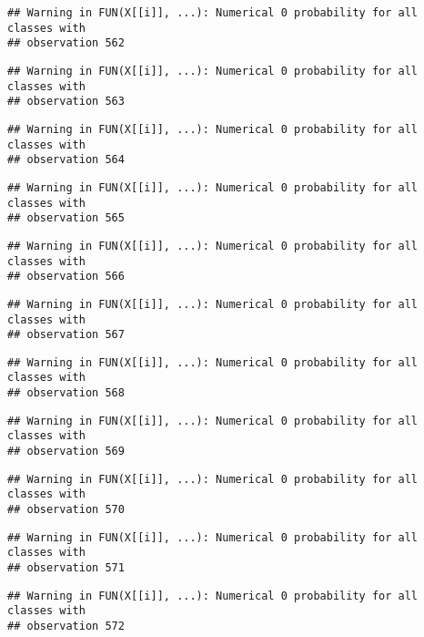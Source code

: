 \documentclass[
]{article}
\begin{document}
\begin{verbatim}
## Warning in FUN(X[[i]], ...): Numerical 0 probability for all classes with
## observation 562
\end{verbatim}

\begin{verbatim}
## Warning in FUN(X[[i]], ...): Numerical 0 probability for all classes with
## observation 563
\end{verbatim}

\begin{verbatim}
## Warning in FUN(X[[i]], ...): Numerical 0 probability for all classes with
## observation 564
\end{verbatim}

\begin{verbatim}
## Warning in FUN(X[[i]], ...): Numerical 0 probability for all classes with
## observation 565
\end{verbatim}

\begin{verbatim}
## Warning in FUN(X[[i]], ...): Numerical 0 probability for all classes with
## observation 566
\end{verbatim}

\begin{verbatim}
## Warning in FUN(X[[i]], ...): Numerical 0 probability for all classes with
## observation 567
\end{verbatim}

\begin{verbatim}
## Warning in FUN(X[[i]], ...): Numerical 0 probability for all classes with
## observation 568
\end{verbatim}

\begin{verbatim}
## Warning in FUN(X[[i]], ...): Numerical 0 probability for all classes with
## observation 569
\end{verbatim}

\begin{verbatim}
## Warning in FUN(X[[i]], ...): Numerical 0 probability for all classes with
## observation 570
\end{verbatim}

\begin{verbatim}
## Warning in FUN(X[[i]], ...): Numerical 0 probability for all classes with
## observation 571
\end{verbatim}

\begin{verbatim}
## Warning in FUN(X[[i]], ...): Numerical 0 probability for all classes with
## observation 572
\end{verbatim}
\end{document}
